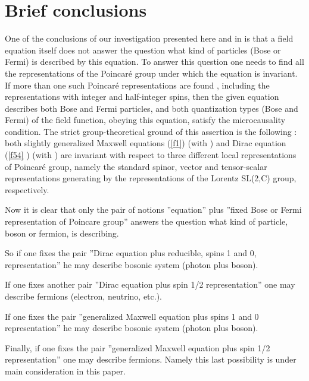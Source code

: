 \documentclass[a4paper,12pt]{article}
\begin{document}
\section{Brief conclusions}

One of the conclusions of our investigation presented here and in \cite
{SK,S2} is that a field equation itself does not answer the question what
kind of particles (Bose or Fermi) is described by this equation. To answer
this question one needs to find all the representations of the Poincar\'e
group under which the equation is invariant. If more than one such
Poincar\'e representations are found \cite{SK}, including the
representations with integer and half-integer spins, then the given equation
describes both Bose and Fermi particles, and both quantization types (Bose
and Fermi) \cite{S2} of the field function, obeying this equation, satisfy
the microcausality condition. The strict group-theoretical ground of this
assertion is the following \cite{SK}: both slightly generalized Maxwell
equations (\ref{f1}) (with \coordHE{}) and Dirac equation (\ref{f54}%
) (with \coordHE{}  \coordHE{}) are invariant with respect to three
different local representations of Poincar\'e group, namely the standard
spinor, vector and tensor-scalar representations generating by the \coordHE{}  \coordHE{}  \coordHE{}
representations of the Lorentz SL(2,C) group, respectively.

Now it is clear that only the pair of notions ''equation'' plus ''fixed Bose
or Fermi representation of Poincare group'' answers the question what kind
of particle, boson or fermion, is describing.

So if one fixes the pair ''Dirac equation plus reducible, spins 1 and 0,
representation'' he may describe bosonic system (photon plus boson).

If one fixes another pair ''Dirac equation plus spin 1/2 representation''
one may describe fermions (electron, neutrino, etc.).

If one fixes the pair ''generalized Maxwell equation plus spins 1 and 0
representation'' he may describe bosonic system (photon plus boson).

Finally, if one fixes the pair ''generalized Maxwell equation plus spin 1/2
representation'' one may describe fermions. Namely this last possibility is
under main consideration in this paper.
\end{document}
